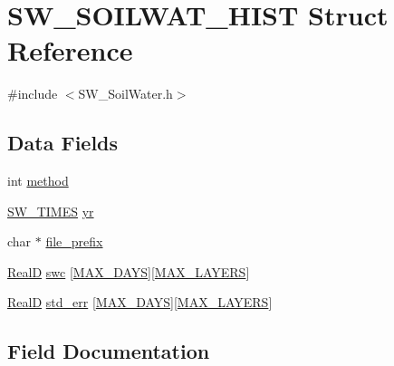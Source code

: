 \hypertarget{struct_s_w___s_o_i_l_w_a_t___h_i_s_t}{}\section{S\+W\+\_\+\+S\+O\+I\+L\+W\+A\+T\+\_\+\+H\+I\+ST Struct Reference}
\label{struct_s_w___s_o_i_l_w_a_t___h_i_s_t}


{\ttfamily \#include $<$S\+W\+\_\+\+Soil\+Water.\+h$>$}

\subsection*{Data Fields}
\begin{DoxyCompactItemize}
\item 
int \hyperlink{struct_s_w___s_o_i_l_w_a_t___h_i_s_t_a0973f0ebe2ca6501995ae3563d59aa57}{method}
\item 
\hyperlink{struct_s_w___t_i_m_e_s}{S\+W\+\_\+\+T\+I\+M\+ES} \hyperlink{struct_s_w___s_o_i_l_w_a_t___h_i_s_t_ad6320d1a34ad896d6cf43162fa30c7b4}{yr}
\item 
char $\ast$ \hyperlink{struct_s_w___s_o_i_l_w_a_t___h_i_s_t_ac3cd2f8bcae8e4fd379d7ba2abc232f3}{file\+\_\+prefix}
\item 
\hyperlink{generic_8h_af1c105fd5732f70b91ddaeda0cc340e3}{RealD} \hyperlink{struct_s_w___s_o_i_l_w_a_t___h_i_s_t_a66412728dccd4d1d3b5e99063baea807}{swc} \mbox{[}\hyperlink{_times_8h_a01f08d46080872b9f4284873b7f9dee4}{M\+A\+X\+\_\+\+D\+A\+YS}\mbox{]}\mbox{[}\hyperlink{_s_w___defines_8h_ade9d4b2ac5f29fe89ffea40e7c58c9d6}{M\+A\+X\+\_\+\+L\+A\+Y\+E\+RS}\mbox{]}
\item 
\hyperlink{generic_8h_af1c105fd5732f70b91ddaeda0cc340e3}{RealD} \hyperlink{struct_s_w___s_o_i_l_w_a_t___h_i_s_t_ad8da2a3488424a1912ecc633269d7ad3}{std\+\_\+err} \mbox{[}\hyperlink{_times_8h_a01f08d46080872b9f4284873b7f9dee4}{M\+A\+X\+\_\+\+D\+A\+YS}\mbox{]}\mbox{[}\hyperlink{_s_w___defines_8h_ade9d4b2ac5f29fe89ffea40e7c58c9d6}{M\+A\+X\+\_\+\+L\+A\+Y\+E\+RS}\mbox{]}
\end{DoxyCompactItemize}


\subsection{Field Documentation}
\mbox{\label{struct_s_w___s_o_i_l_w_a_t___h_i_s_t_ac3cd2f8bcae8e4fd379d7ba2abc232f3}} 
